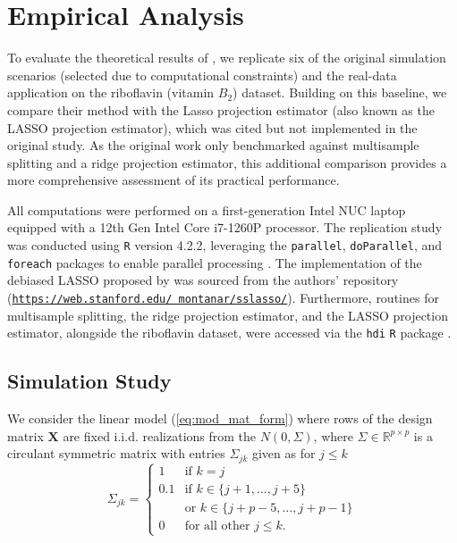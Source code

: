 \documentclass{article}
\begin{document}
\section{Empirical Analysis}
\label{sec:empirical_analysis}
To evaluate the theoretical results of \citet{javanmard14a}, we replicate six of the original simulation scenarios (selected due to computational constraints) and the real-data application on the riboflavin (vitamin $B_2$) dataset. Building on this baseline, we compare their method with the Lasso projection estimator \citep{vandegeer2014asymptotically, zhang2014confidence, buhlmann2015misspecified} (also known as the LASSO projection estimator), which was cited but not implemented in the original study. As the original work only benchmarked against multisample splitting and a ridge projection estimator, this additional comparison provides a more comprehensive assessment of its practical performance.

All computations were performed on a first-generation Intel NUC laptop equipped with a 12th Gen Intel Core i7-1260P processor. The replication study was conducted using \texttt{R} version 4.2.2, leveraging the \texttt{parallel}, \texttt{doParallel}, and \texttt{foreach} packages to enable parallel processing \citep{rlanguage, doParalllelpkg, foreachpkg}. The implementation of the debiased LASSO proposed by \citet{javanmard14a} was sourced from the authors' repository (\href{https://web.stanford.edu/~montanar/sslasso/}{\texttt{https://web.stanford.edu/~montanar/sslasso/}}). Furthermore, routines for multisample splitting, the ridge projection estimator, and the LASSO projection estimator, alongside the riboflavin dataset, were accessed via the \texttt{hdi} \texttt{R} package \citep{hdi_pkg2015}.
 
\subsection{Simulation Study}
\label{sec:3.1}
We consider the linear model (\ref{eq:mod_mat_form}) where rows of the design matrix $\mathbf{X}$ are fixed i.i.d. realizations from the  $N(0, \Sigma)$, where $\Sigma \in \mathbb{R}^{p\times p}$ is a circulant symmetric matrix with entries $\Sigma_{jk}$ given as for $j \le k$
\begin{equation}
\label{eq:circulant_mat}
    \Sigma_{jk} = \begin{cases}
    1 &\text{if } k= j\\
    0.1 & \text{if } k \in\{j+1, \dots, j+5 \}\\
   & \text{or } k \in \{j+p-5, \dots, j+p-1\}\\
    0 & \text{for all other } j\le k.
    \end{cases}
\end{equation}
\end{document}
